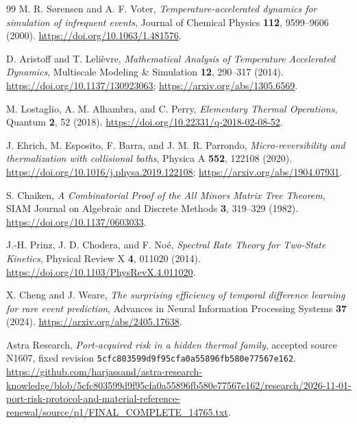 \documentclass[10pt,a4paper]{article}
\theoremstyle{definition}\newtheorem{assumption}[theorem]{Assumption}
\newcommand{\revhash}{5cfc803599d9f95cfa0a55896fb580e77567e162}
\begin{document}
\begin{thebibliography}{99}
M. R. S{\o}rensen and A. F. Voter,
\emph{Temperature-accelerated dynamics for simulation of infrequent events},
Journal of Chemical Physics \textbf{112}, 9599--9606 (2000).
\url{https://doi.org/10.1063/1.481576}.

D. Aristoff and T. Leli\`evre, \emph{Mathematical Analysis of Temperature Accelerated Dynamics},
Multiscale Modeling \& Simulation \textbf{12}, 290--317 (2014).
\url{https://doi.org/10.1137/130923063};
\url{https://arxiv.org/abs/1305.6569}.

M. Lostaglio, A. M. Alhambra, and C. Perry, \emph{Elementary Thermal Operations},
Quantum \textbf{2}, 52 (2018).
\url{https://doi.org/10.22331/q-2018-02-08-52}.

J. Ehrich, M. Esposito, F. Barra, and J. M. R. Parrondo,
\emph{Micro-reversibility and thermalization with collisional baths},
Physica A \textbf{552}, 122108 (2020).
\url{https://doi.org/10.1016/j.physa.2019.122108};
\url{https://arxiv.org/abs/1904.07931}.

S. Chaiken, \emph{A Combinatorial Proof of the All Minors Matrix Tree Theorem},
SIAM Journal on Algebraic and Discrete Methods \textbf{3}, 319--329 (1982).
\url{https://doi.org/10.1137/0603033}.

J.-H. Prinz, J. D. Chodera, and F. No\'e,
\emph{Spectral Rate Theory for Two-State Kinetics},
Physical Review X \textbf{4}, 011020 (2014).
\url{https://doi.org/10.1103/PhysRevX.4.011020}.

X. Cheng and J. Weare,
\emph{The surprising efficiency of temporal difference learning for rare event prediction},
Advances in Neural Information Processing Systems \textbf{37} (2024).
\url{https://arxiv.org/abs/2405.17638}.

Astra Research, \emph{Port-acquired risk in a hidden thermal family},
accepted source N1607, fixed revision \texttt{\revhash}.
\url{https://github.com/harjassand/astra-research-knowledge/blob/5cfc803599d9f95cfa0a55896fb580e77567e162/research/2026-11-01-port-risk-protocol-and-material-reference-renewal/source/p1/FINAL_COMPLETE_14765.txt}.

\end{thebibliography}
\end{document}
